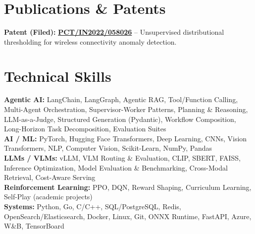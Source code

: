 \documentclass[letterpaper,11pt]{article}
\begin{document}

\resumeItemListEnd
\resumeSubHeadingListEnd

\section{Publications \& Patents}
\resumeSubHeadingListStart
\resumeProjectHeading
{\textbf{Patent (Filed):} \href{https://patents.justia.com/inventor/vedaang-chopra}{\textbf{PCT/IN2022/058026}} -- Unsupervised distributional thresholding for wireless
  connectivity anomaly detection.}{}
\resumeSubHeadingListEnd

\section{Technical Skills}
\footnotesize
\textbf{Agentic AI:} LangChain, LangGraph, Agentic RAG, Tool/Function Calling, Multi-Agent Orchestration,
  Supervisor-Worker Patterns, Planning \& Reasoning, LLM-as-a-Judge, Structured Generation (Pydantic),
  Workflow Composition, Long-Horizon Task Decomposition, Evaluation Suites \\[1pt]
\textbf{AI / ML:} PyTorch, Hugging Face Transformers, Deep Learning, CNNs, Vision Transformers, NLP,
  Computer Vision, Scikit-Learn, NumPy, Pandas \\[1pt]
\textbf{LLMs / VLMs:} vLLM, VLM Routing \& Evaluation, CLIP, SBERT, FAISS, Inference Optimization,
  Model Evaluation \& Benchmarking, Cross-Modal Retrieval, Cost-Aware Serving \\[1pt]
\textbf{Reinforcement Learning:} PPO, DQN, Reward Shaping, Curriculum Learning, Self-Play (academic projects) \\[1pt]
\textbf{Systems:} Python, Go, C/C++, SQL/PostgreSQL, Redis, OpenSearch/Elasticsearch, Docker, Linux, Git,
  ONNX Runtime, FastAPI, Azure, W\&B, TensorBoard
\end{document}
